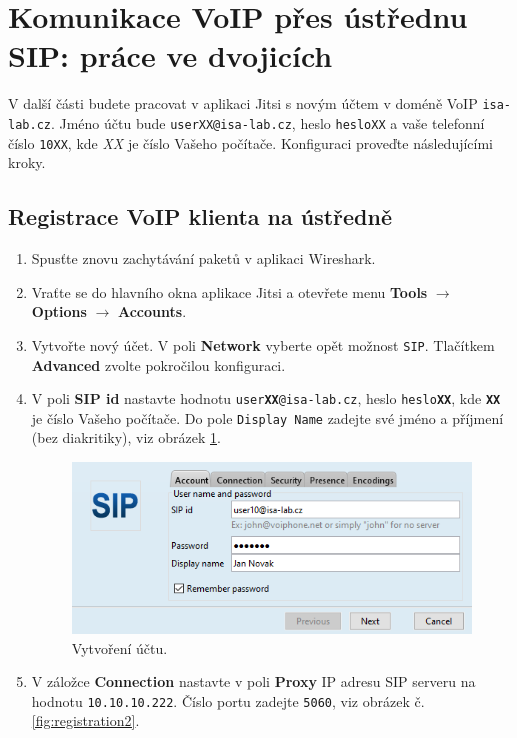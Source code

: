 \section{Komunikace VoIP přes ústřednu SIP: práce ve dvojicích}
V další části budete pracovat v aplikaci Jitsi s novým účtem v doméně VoIP {\tt isa-lab.cz}. Jméno účtu bude {\tt userXX@isa-lab.cz}, heslo {\tt hesloXX} a vaše telefonní číslo {\tt 10XX}, kde {\it XX} je číslo Vašeho počítače. Konfiguraci proveďte následujícími kroky. 

\subsection{Registrace VoIP klienta na ústředně}
\begin{enumerate}
    \item Spusťte znovu zachytávání paketů v aplikaci Wireshark.
    \item Vraťte se do hlavního okna aplikace Jitsi a otevřete menu {\bf Tools} $\rightarrow$ {\bf Options} $\rightarrow$ {\bf Accounts}.
    \item Vytvořte nový účet. V poli {\bf Network} vyberte opět možnost {\tt SIP}. Tlačítkem {\bf Advanced} zvolte pokročilou konfiguraci.
    \item V poli {\bf SIP id} nastavte hodnotu {\tt user{\bf XX}@isa-lab.cz}, heslo {\tt heslo{\bf XX}}, kde {\tt\bf XX} je číslo Vašeho počítače. Do pole {\tt Display Name} zadejte své jméno a příjmení (bez diakritiky), viz obrázek \ref{fig:registration1}.
      \begin{figure}[h!]
        \centering
        \includegraphics[scale=0.7]{img/jitsi-registration1c.png}
        \caption{Vytvoření účtu.}
        \label{fig:registration1}
      \end{figure}
    \item V záložce {\bf Connection} nastavte v poli {\bf Proxy} IP adresu SIP serveru na hodnotu {\tt 10.10.10.222}. Číslo portu zadejte {\tt 5060}, viz obrázek č. \ref{fig:registration2}. 

\end{enumerate}
